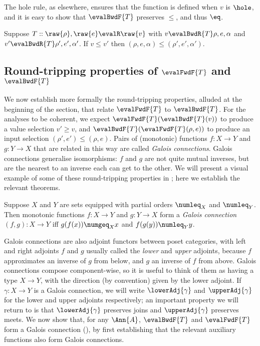  The hole rule, as elsewhere, ensures that the function is defined when $v$ is $\hole$, and it is easy to show that $\evalBwdF{T}$  preserves $\leq$, and thus $\eq$.

\begin{lemma}
   Suppose $T :: \raw{\rho}, \raw{e} \evalR \raw{v}$ with $v \evalBwdR{T} \rho, e, \alpha $ and $v' \evalBwdR{T} \rho', e', \alpha' $. If $v \leq v'$ then $(\rho, e, \alpha) \leq (\rho', e', \alpha')$.
\end{lemma}

\subsection{Round-tripping properties of $\evalFwdF{T}$ and $\evalBwdF{T}$}
\label{sec:data-dependencies:galois-connections}

We now establish more formally the round-tripping properties, alluded at the beginning of the section, that relate $\evalFwdF{T}$ to $\evalBwdF{T}$. For the analyses to be coherent, we expect $\evalFwdF{T}(\evalBwdF{T}(v))$ to produce a value selection $v' \geq v$, and $\evalBwdF{T}(\evalFwdF{T}(\rho,e))$ to produce an input selection $(\rho',e') \leq (\rho,e)$. Pairs of (monotonic) functions $f: X \to Y$ and $g: Y \to X$ that are related in this way are called \emph{Galois connections}. Galois connections generalise isomorphisms: $f$ and $g$ are not quite mutual inverses, but are the nearest to an inverse each can get to the other. We will present a visual example of some of these round-tripping properties in ; here we establish the relevant theorems.

\begin{definition}
   Suppose $X$ and $Y$ are sets equipped with partial orders $\numleq_X$ and $\numleq_Y$. Then monotonic functions $f: X \to Y$ and $g: Y \to X$ form a \emph{Galois connection} $(f, g): X \to Y$ iff $g(f(x)) \numgeq_X x$ and $f(g(y)) \numleq_Y y$.
\end{definition}

\noindent Galois connections are also adjoint functors between poset categories, with left and right adjoints $f$ and $g$  usually called the \emph{lower} and \emph{upper} adjoints, because $f$ approximates an inverse of $g$ from below, and $g$ an inverse of $f$ from above. Galois connections compose component-wise, so it is useful to think of them as having a type $X \to Y$, with the direction (by convention) given by the lower adjoint. If $\gamma: X \to Y$ is a Galois connection, we will write $\lowerAdj{\gamma}$ and $\upperAdj{\gamma}$ for the lower and upper adjoints respectively; an important property we will return to is that $\lowerAdj{\gamma}$ preserves joins and $\upperAdj{\gamma}$ preserves meets. We now show that, for any $\Ann{A}$, $\evalBwdF{T}$ and $\evalFwdF{T}$ form a Galois connection (), by first establishing that the relevant auxiliary functions also form Galois connections.

